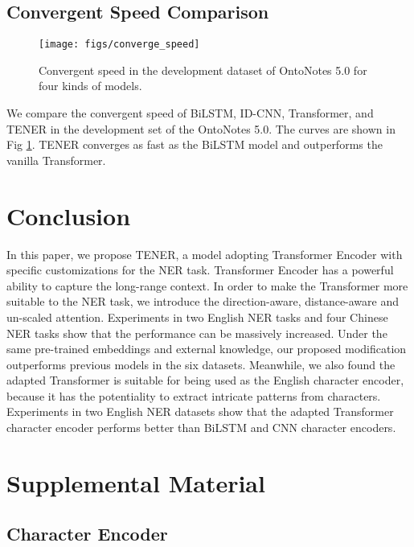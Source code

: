 \documentclass[11pt,a4paper]{article}
\begin{document}
\subsection{Convergent Speed Comparison}

\begin{figure}[ht]
    \centering
    \texttt{[image: figs/converge\_speed]}
    \caption{Convergent speed in the development dataset of OntoNotes 5.0 for four kinds of models.} \label{fig:converge_speed}
\end{figure}

We compare the convergent speed of BiLSTM, ID-CNN, Transformer, and TENER in the development set of the OntoNotes 5.0. The curves are shown in Fig \ref{fig:converge_speed}. TENER converges as fast as the BiLSTM model and outperforms the vanilla Transformer.


\section{Conclusion}
In this paper, we propose TENER, a model adopting Transformer Encoder with specific customizations for the NER task. Transformer Encoder has a powerful ability to capture the long-range context. In order to make the Transformer more suitable to the NER task, we introduce the direction-aware, distance-aware and un-scaled attention. Experiments in two English NER tasks and four Chinese NER tasks show that the performance can be massively increased. Under the same pre-trained embeddings and external knowledge, our proposed modification outperforms previous models in the six datasets. Meanwhile, we also found the adapted Transformer is suitable for being used as the English character encoder, because it has the potentiality to extract intricate patterns from characters. Experiments in two English NER datasets show that the adapted Transformer character encoder performs better than BiLSTM and CNN character encoders.








\section{Supplemental Material}

\subsection{Character Encoder} \label{supply:char_embed}
\end{document}
